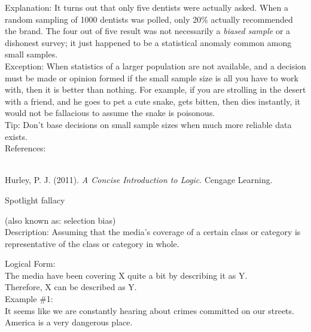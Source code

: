 \documentclass[a4paper,12pt,single,pdftex]{scrbook}
\begin{document}
{    
      Explanation: It turns out that only five dentists were actually asked.  When a random sampling of 1000 dentists was polled, only 20\% actually recommended the brand.  The four out of five result was not necessarily a {\it biased sample} or a dishonest survey; it just happened to be a statistical anomaly common among small samples.
    \\

    
      Exception: When statistics of a larger population are not available, and a decision must be made or opinion formed if the small sample size is all you have to work with, then it is better than nothing.  For example, if you are strolling in the desert with a friend, and he goes to pet a cute snake, gets bitten, then dies instantly, it would not be fallacious to assume the snake is poisonous.
    \\

    
      Tip: Don’t base decisions on small sample sizes when much more reliable data exists.
    \\

    References:

    
      
        
      \\

      
        
          Hurley, P. J. (2011). {\it A Concise Introduction to Logic}. Cengage Learning.
        
      
    
  }


Spotlight fallacy
    
      (also known as: selection bias)
    \\

  
    Description: Assuming that the media’s coverage of a certain class or category is representative of the class or category in whole.

    
      Logical Form:
    \\

    
      The media have been covering X quite a bit by describing it as Y.
    \\

    
      Therefore, X can be described as Y.
    \\

    
      Example \#1:
    \\

    
      It seems like we are constantly hearing about crimes committed on our streets.  America is a very dangerous place.
    \\
\end{document}
